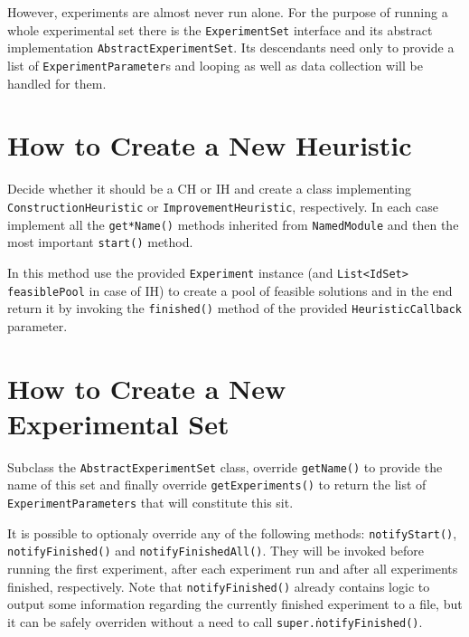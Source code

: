 However, experiments are almost never run alone. For the purpose of running a whole experimental set there is the \texttt{Experiment\-Set} interface and its abstract implementation \texttt{Abstract\-Experiment\-Set}. Its descendants need only to provide a list of \texttt{Experiment\-Parameter}s and looping as well as data collection will be handled for them.

\section{How to Create a New Heuristic}
\label{section-appendix-iss-howto}

Decide whether it should be a CH or IH and create a class implementing \texttt{Con\-struc\-tion\-Heu\-ris\-tic} or \texttt{Im\-prove\-ment\-Heu\-ris\-tic}, respectively. In each case implement all the \texttt{get*Name()} methods inherited from \texttt{Named\-Module} and then the most important \texttt{start()} method.

In this method use the provided \texttt{Experiment} instance (and \texttt{List<IdSet> feasiblePool} in case of IH) to create a pool of feasible solutions and in the end return it by invoking the \texttt{finished()} method of the provided \texttt{Heuristic\-Callback} parameter.

\section{How to Create a New Experimental Set}

Subclass the \texttt{Abstract\-Experiment\-Set} class, override \texttt{get\-Name()} to provide the name of this set and finally override \texttt{get\-Experiments()} to return the list of \texttt{Experiment\-Parameters} that will constitute this sit.

It is possible to optionaly override any of the following methods: \texttt{notify\-Start()}, \texttt{notify\-Finished()} and \texttt{notify\-Finished\-All()}. They will be invoked before running the first experiment, after each experiment run and after all experiments finished, respectively. Note that \texttt{notify\-Finished()} already contains logic to output some information regarding the currently finished experiment to a file, but it can be safely overriden without a need to call \texttt{super.\.notify\-Finished()}.